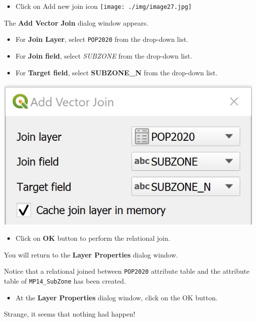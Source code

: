 \documentclass[
  letterpaper,
  DIV=11,
  numbers=noendperiod]{scrreprt}
\providecommand{\tightlist}{%
  \setlength{\itemsep}{0pt}\setlength{\parskip}{0pt}}\usepackage{longtable,booktabs,array}
\begin{document}
\begin{itemize}
\tightlist
\item
  Click on Add new join icon
  \texttt{[image: ./img/image27.jpg]}
\end{itemize}

The \textbf{Add Vector Join} dialog window appears.

\begin{itemize}
\tightlist
\item
  For \textbf{Join Layer}, select \texttt{POP2020} from the drop-down
  list.
\item
  For \textbf{Join field}, select \emph{SUBZONE} from the drop-down
  list.
\item
  For \textbf{Target field}, select \textbf{SUBZONE\_N} from the
  drop-down list.
\end{itemize}

\includegraphics{./img03/image28.jpg}

\begin{itemize}
\tightlist
\item
  Click on \textbf{OK} button to perform the relational join.
\end{itemize}

You will return to the \textbf{Layer Properties} dialog window.

Notice that a relational joined between \texttt{POP2020} attribute table
and the attribute table of \texttt{MP14\_SubZone} has been created.

\begin{itemize}
\tightlist
\item
  At the \textbf{Layer Properties} dialog window, click on the OK
  button.
\end{itemize}

Strange, it seems that nothing had happen!
\end{document}
